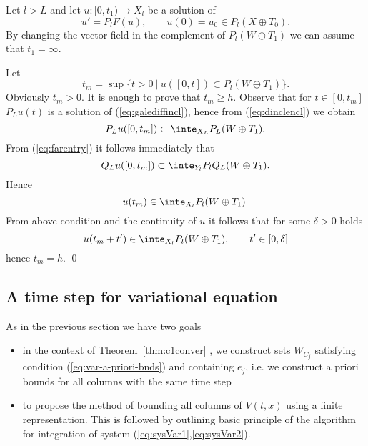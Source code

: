 Let $l > L$ and let $u:[0,t_1) \to X_l$ be a solution of
\begin{equation*}
  u'=P_lF(u), \qquad u(0) = u_0 \in P_l(X \oplus T_0).
\end{equation*}
By changing the vector field in the complement of  $P_l (W \oplus
T_1)$ we can assume that $t_1=\infty$.

Let
\begin{equation*}
  t_m=\sup\{ t >0 \: | \: u([0,t]) \subset P_l (W \oplus
T_1)\}.
\end{equation*}
Obviously $t_m >0$. It is enough to prove that $t_m \geq h$.
Observe that for $t \in [0,t_m]$ $P_Lu(t)$ is a solution of
(\ref{eq:galediffincl}), hence from (\ref{eq:dinclencl}) we obtain
\begin{equation*}
  P_L u([0,t_m])  \subset \inte_{X_L} P_L (W \oplus T_1).
\end{equation*}
From (\ref{eq:farentry}) it follows immediately that
\begin{equation*}
  Q_L u([0,t_m]) \subset \inte_{Y_l} P_lQ_L(W \oplus T_1).
\end{equation*}
Hence
\begin{equation*}
   u(t_m) \in \inte_{X_l} P_l(W \oplus T_1).
\end{equation*}
From above condition and the continuity of $u$ it follows that for
some $\delta >0$ holds
\begin{equation*}
   u(t_m+t') \in \inte_{X_l} P_l(W \oplus T_1), \qquad t'\in [0,\delta]
\end{equation*}
hence $t_m=h$.
 \qed


\subsection{A time step for variational equation}

As in the previous section we have two goals
\begin{itemize}
\item in the context of Theorem~\ref{thm:c1conver} , we construct sets $W_{C_j}$ satisfying condition (\ref{eq:var-a-priori-bnds}) and
containing $e_j$, i.e. we construct a priori bounds for all columns with the same time step
\item to propose the method of bounding all columns of $V(t,x)$ using a finite representation. This is followed by outlining basic principle of the algorithm for integration
  of system (\ref{eq:sysVar1},\ref{eq:sysVar2}).
\end{itemize}

